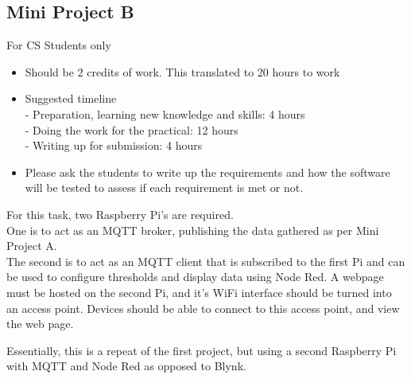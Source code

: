\subsection{Mini Project B}
For CS Students only
\begin{itemize}
    \item Should be 2 credits of work. This translated to 20 hours to work
    \item Suggested timeline\\
    - Preparation, learning new knowledge and skills: 4 hours\\
    - Doing the work for the practical: 12 hours\\
    - Writing up for submission: 4 hours
    \item Please ask the students to write up the requirements and how the software will be tested to assess if each requirement is met or not.
\end{itemize}

For this task, two Raspberry Pi's are required.\\
One is to act as an MQTT broker, publishing the data gathered as per Mini Project A.\\
The second is to act as an MQTT client that is subscribed to the first Pi and can be used to configure thresholds and display data using Node Red. A webpage must be hosted on the second Pi, and it's WiFi interface should be turned into an access point. Devices should be able to connect to this access point, and view the web page.

Essentially, this is a repeat of the first project, but using a second Raspberry Pi with MQTT and Node Red as opposed to Blynk.